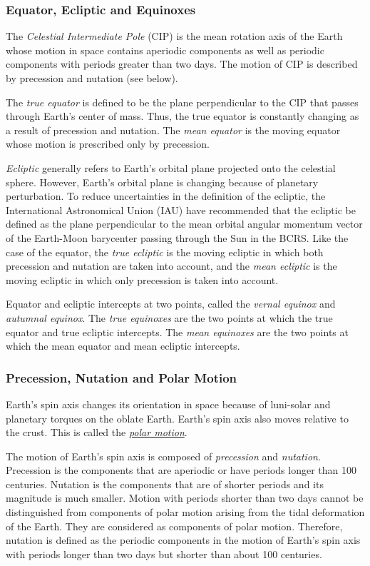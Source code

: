 \documentclass[12pt]{article}
\begin{document}
\begin{CJK}{UTF8}{bkai}
\subsubsection{Equator, Ecliptic and Equinoxes} 

The {\em Celestial Intermediate Pole} (CIP) is the mean rotation axis of the Earth
whose motion in space contains aperiodic components as well as periodic
components with periods greater than two days. The motion of CIP is described
by precession and nutation (see below).

The {\em true equator} is defined to be the plane perpendicular to the CIP
that passes through Earth's center of mass. Thus, the true equator is constantly
changing as a result of precession and nutation. The {\em mean equator}
is the moving equator whose motion is prescribed only by precession.

{\em Ecliptic} generally refers to Earth's orbital plane projected onto the
celestial sphere. However, Earth's orbital plane is changing because of
planetary perturbation. To reduce uncertainties in the definition of the
ecliptic, the International Astronomical Union (IAU) have recommended that 
the ecliptic be defined as the plane
perpendicular to the mean orbital angular momentum vector of the Earth-Moon
barycenter passing through the Sun in the BCRS. 
Like the case of the equator, the {\em true ecliptic} is the moving ecliptic in 
which both precession and nutation are taken into account, and the {\em mean ecliptic} 
is the moving ecliptic in which only precession is taken into account.

Equator and ecliptic intercepts at two points, called the {\em vernal equinox} and
{\em autumnal equinox}. The {\em true equinoxes} are the two points at which the true
equator and true ecliptic intercepts. The {\em mean equinoxes} are the two points
at which the mean equator and mean ecliptic intercepts.

\subsubsection{Precession, Nutation and Polar Motion}

Earth's spin axis changes its orientation in space because of
luni-solar and planetary torques on the oblate Earth.
Earth's spin axis also moves relative to the crust. This is called the
\href{https://en.wikipedia.org/wiki/Polar_motion}{\it polar motion}.

The motion of Earth's spin axis is composed of {\em precession} and {\em nutation}.
Precession is the components that are aperiodic or have periods longer
than 100 centuries. Nutation is the components that are of shorter periods
and its magnitude is much smaller. Motion with periods shorter than two days
cannot be distinguished from components of polar motion arising from the tidal
deformation of the Earth. They are considered as components of polar motion.
Therefore, nutation is defined as the periodic components in the motion of
Earth's spin axis with periods longer than two days but shorter than about 100 centuries.


\end{CJK}
\end{document}
